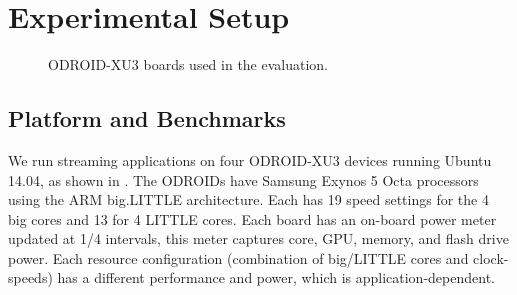 \section{Experimental Setup}
\begin{figure}[t]
 \caption{ODROID-XU3 boards used in the evaluation.}
 \label{fig:odroidall}
\end{figure}

\subsection{Platform and Benchmarks}
We run streaming applications on four ODROID-XU3 devices running
Ubuntu 14.04, as shown in . The ODROIDs have
Samsung Exynos 5 Octa processors using the ARM big.LITTLE
architecture.  Each has 19 speed settings for the 4 big cores and 13
for 4 LITTLE cores.  Each board has an on-board power meter updated at
1/4 \ms intervals, this meter captures core, GPU, memory, and flash
drive power.  Each resource configuration (combination of big/LITTLE
cores and clock-speeds) has a different performance and power, which
is application-dependent.

